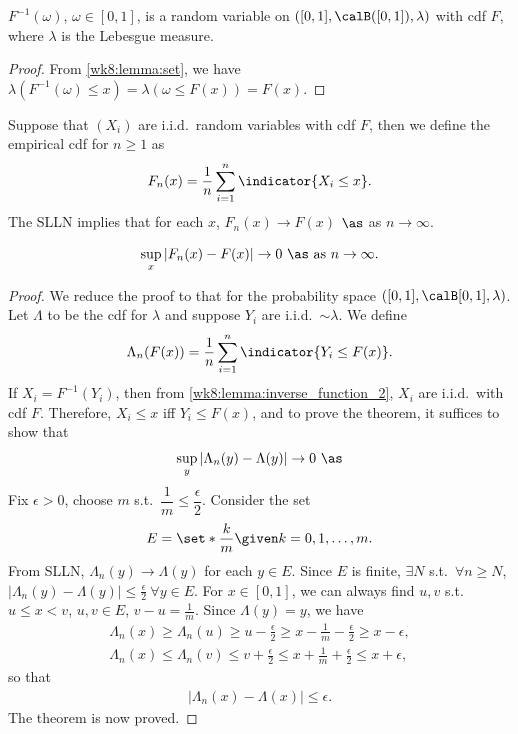\documentclass[../aipt.tex]{subfiles}
\begin{document}
\begin{Lemma} \label{wk8:lemma:inverse_function_2}
$F^{-1}(\omega)$, $\omega\in[0,1]$, is a random variable on $([0,1],\calB([0,1]),\lambda)$ with cdf $F$, where $\lambda$ is the Lebesgue measure.
\end{Lemma}
\begin{proof}
From \cref{wk8:lemma:set}, we have $\lambda (F^{-1}(\omega)\leq x)= \lambda (\omega \leq F(x))=F(x)$.
\end{proof}

Suppose that $(X_i)$ are i.i.d.\ random variables with cdf $F$, then we define the empirical cdf for $n\geq1$ as
\begin{align*}
F_n(x)=\frac{1}{n}\sum_{i=1}^n \indicator{X_i\leq x}.
\end{align*}
The SLLN implies that for each $x$, $F_n(x)\to F(x)$ $\as$ as $n\to \infty$. 

\begin{Theorem}
\begin{align*}
\sup_{x}|F_n(x)-F(x)| \to 0\ \as\ \text{as}\ n \to \infty.
\end{align*}
\end{Theorem}
\begin{proof}
We reduce the proof to that for the probability space $([0,1],\calB[0,1],\lambda)$. Let $\Lambda$ to be the cdf for $\lambda$ and suppose $Y_i$ are i.i.d.\ $\sim \lambda$. We define 
\begin{align*}
\Lambda_n(F(x))=\frac{1}{n}\sum_{i=1}^n \indicator{Y_i\leq F(x)}.
\end{align*}
If $X_i= F^{-1}(Y_i)$, then from \cref{wk8:lemma:inverse_function_2}, $X_i$ are i.i.d.\ with cdf $F$. Therefore, $X_i \leq x$ iff $Y_i \leq F(x)$, and to prove the theorem, it suffices to show that 
\begin{align*}
\sup_{y} |\Lambda_n(y)-\Lambda(y)|\to 0\ \as
\end{align*}
Fix $\epsilon >0$, choose $m$ s.t.\ $\dfrac{1}{m} \leq \dfrac{\epsilon}{2}$. Consider the set 
\begin{align*}
E=\set*{\frac{k}{m}\given k=0,1,\ldots,m}.
\end{align*}
From SLLN, $\Lambda _n (y) \to \Lambda(y)$ for each $y\in E$. Since $E$ is finite, $\exists N$ s.t.\ $\forall n \geq N$, $|\Lambda_n (y)-\Lambda (y)| \leq \frac{\epsilon}{2} \ \forall y \in E$. For $x \in [0,1]$, we can always find $u,v$ s.t.\ $u\leq x <v$, $u,v \in E$, $v-u=\frac{1}{m}$.
Since $\Lambda (y)=y$, we have
\begin{align*}
\Lambda_n (x)\geq \Lambda_n (u) \geq u-\frac{\epsilon}{2} \geq x-\frac{1}{m} -\frac{\epsilon}{2} \geq x-\epsilon,\\
\Lambda_n (x)\leq \Lambda_n (v) \leq v+\frac{\epsilon}{2} \leq x+\frac{1}{m} +\frac{\epsilon}{2} \leq x+\epsilon,
\end{align*}
so that
\begin{align*}
|\Lambda_n(x)-\Lambda(x)|\leq \epsilon.
\end{align*}
The theorem is now proved.
\end{proof}
\end{document}

